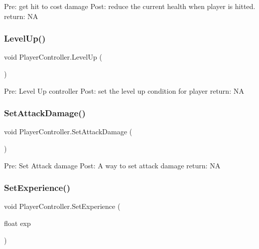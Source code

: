 Pre\+: get hit to cost damage Post\+: reduce the current health when player is hitted. return\+: NA \mbox{\label{class_player_controller_af6369eee5fe0a5ae1193a243b0163097}} 
\subsubsection{\texorpdfstring{Level\+Up()}{LevelUp()}}
{\footnotesize\ttfamily void Player\+Controller.\+Level\+Up (\begin{DoxyParamCaption}{ }\end{DoxyParamCaption})\hspace{0.3cm}{\ttfamily [private]}}

Pre\+: Level Up controller Post\+: set the level up condition for player return\+: NA \mbox{\label{class_player_controller_ae0e3dd0ef44f9a50af9c884f56512b13}} 
\subsubsection{\texorpdfstring{Set\+Attack\+Damage()}{SetAttackDamage()}}
{\footnotesize\ttfamily void Player\+Controller.\+Set\+Attack\+Damage (\begin{DoxyParamCaption}{ }\end{DoxyParamCaption})\hspace{0.3cm}{\ttfamily [private]}}

Pre\+: Set Attack damage Post\+: A way to set attack damage return\+: NA \mbox{\label{class_player_controller_a14434c4f065a70cceb5534243df61b2b}} 
\subsubsection{\texorpdfstring{Set\+Experience()}{SetExperience()}}
{\footnotesize\ttfamily void Player\+Controller.\+Set\+Experience (\begin{DoxyParamCaption}\item[{float}]{exp }\end{DoxyParamCaption})}


